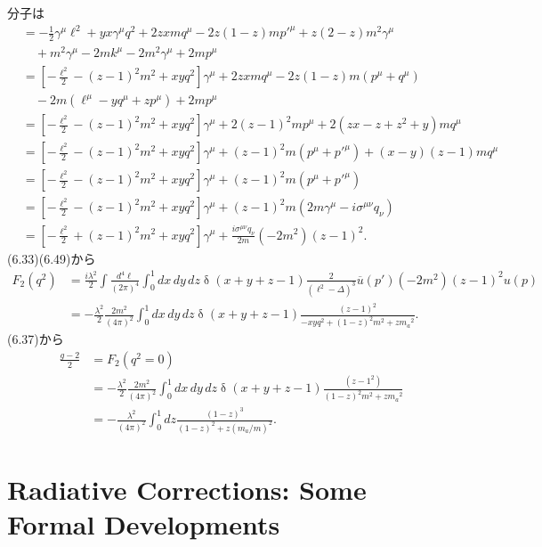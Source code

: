 分子は
\begin{align*}
  &= -\frac{1}{2} \gamma^\mu \ell^2 + yx \gamma^\mu q^2 + 2zx m q^\mu - 2z(1-z) m p'^\mu + z(2-z)m^2 \gamma^\mu \\
  & \quad + m^2 \gamma^\mu - 2mk^\mu - 2m^2 \gamma^\mu + 2mp^\mu \\
  &= \left[ -\frac{\ell^2}{2} - (z - 1)^2 m^2 + xy q^2 \right] \gamma^\mu + 2zx m q^\mu - 2z(1-z) m (p^\mu + q^\mu) \\
  & \quad - 2m(\ell^\mu - yq^\mu + zp^\mu) + 2mp^\mu \\
  &= \left[ -\frac{\ell^2}{2} - (z - 1)^2 m^2 + xy q^2 \right] \gamma^\mu + 2(z - 1)^2 mp^\mu + 2 (zx - z + z^2 + y) mq^\mu \\
  &= \left[ -\frac{\ell^2}{2} - (z - 1)^2 m^2 + xy q^2 \right] \gamma^\mu + (z - 1)^2 m (p^\mu + p'^\mu) + (x-y)(z-1) mq^\mu \\
  &= \left[ -\frac{\ell^2}{2} - (z - 1)^2 m^2 + xy q^2 \right] \gamma^\mu + (z - 1)^2 m (p^\mu + p'^\mu) \\
  &= \left[ -\frac{\ell^2}{2} - (z - 1)^2 m^2 + xy q^2 \right] \gamma^\mu + (z - 1)^2 m (2m\gamma^\mu - i \sigma^{\mu\nu}q_\nu) \\
  &= \left[ -\frac{\ell^2}{2} + (z - 1)^2 m^2 + xy q^2 \right] \gamma^\mu + \frac{i \sigma^{\mu\nu}q_\nu}{2m} (-2m^2) (z - 1)^2 .
\end{align*}
(6.33)(6.49)から
\begin{align*}
  F_2(q^2) &= \frac{i\lambda^2}{2} \int \frac{d^4\ell}{(2\pi)^4} \int_0^1 dx \, dy \, dz  \mathop\delta(x+y+z-1) \frac{2}{(\ell^2 - \Delta)^3} \overline{u}(p') (-2m^2) (z - 1)^2 u(p) \\
  &= -\frac{\lambda^2}{2} \frac{2m^2}{(4\pi)^2}  \int_0^1 dx \, dy \, dz  \mathop\delta(x+y+z-1) \frac{(z - 1)^2}{-xyq^2 + (1-z)^2 m^2 +zm_a{}^2} .
\end{align*}
(6.37)から
\begin{align*}
  \frac{g-2}{2} &=  F_2(q^2=0) \\
   &= -\frac{\lambda^2}{2} \frac{2m^2}{(4\pi)^2}  \int_0^1 dx \, dy \, dz  \mathop\delta(x+y+z-1) \frac{(z - 1^2)}{(1-z)^2 m^2 +zm_a{}^2} \\
  &= -\frac{\lambda^2}{(4\pi)^2} \int_0^1 dz \frac{(1-z)^3}{(1-z)^2  +z(m_a/m)^2} .
\end{align*}

\chapter{Radiative Corrections: Some Formal Developments}
\setcounter{section}{1}
